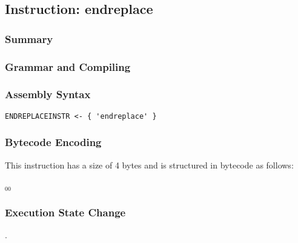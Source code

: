 \subsection{Instruction: endreplace}

\subsubsection{Summary}


\subsubsection{Grammar and Compiling}


\subsubsection{Assembly Syntax}

\begin{myquote}
\begin{verbatim}
ENDREPLACEINSTR <- { 'endreplace' }
\end{verbatim}
\end{myquote}

\subsubsection{Bytecode Encoding}

This instruction has a size of 4 bytes and is structured in bytecode as follows:

$_{00}$\ 


\subsubsection{Execution State Change}

.


